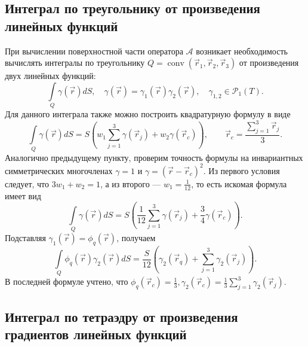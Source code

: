 \subsection{Интеграл по треугольнику от произведения линейных функций}

При вычислении поверхностной части оператора $\mathcal{A}$ возникает необходимость вычислять интегралы по треугольнику $Q = \operatorname{conv}(\vec r_1, \vec r_2, \vec r_3)$ от произведения двух линейных функций:
\[
\int\limits_{Q} \gamma(\vec r) dS, \quad \gamma(\vec r) = \gamma_1(\vec r)\gamma_2(\vec r), \quad \gamma_{1,2} \in \mathcal{P}_1(T).
\]
Для данного интеграла также можно построить квадратурную формулу в виде
\[
\int\limits_{Q} \gamma(\vec r) dS = S \left(w_1 \sum_{j = 1}^3 \gamma(\vec r_j) + w_2 \gamma(\vec r_c)\right), \qquad \vec r_c = \frac{\sum_{j=1}^3 \vec r_j}{3}.
\]
Аналогично предыдущему пункту, проверим точность формулы на инвариантных симметрических многочленах $\gamma = 1$ и $\gamma = (\vec r - \vec r_c)^2$. Из первого условия следует, что
$3w_1 + w_2 = 1$, а из второго --- $w_1 = \frac{1}{12}$, то есть искомая формула имеет вид
\[
\int\limits_{Q} \gamma(\vec r) dS = S \left(\frac{1}{12} \sum_{j = 1}^3 \gamma(\vec r_j) + \frac{3}{4} \gamma(\vec r_c)\right).
\]
Подставляя $\gamma_1(\vec r) = \phi_q(\vec r)$, получаем
\[
\int\limits_{Q} \phi_q(\vec r)\gamma_2(\vec r) dS = \frac{S}{12} \left( \gamma_2(\vec r_q) + \sum_{j=1}^3 \gamma_2(\vec r_j)\right).
\]
В последней формуле учтено, что $\phi_q(\vec r_c) = \frac{1}{3}, \gamma_2(\vec r_c) = \frac{1}{3}\sum_{j=1}^3\gamma_2(\vec r_j)$.

\subsection{Интеграл по тетраэдру от произведения градиентов линейных функций}

